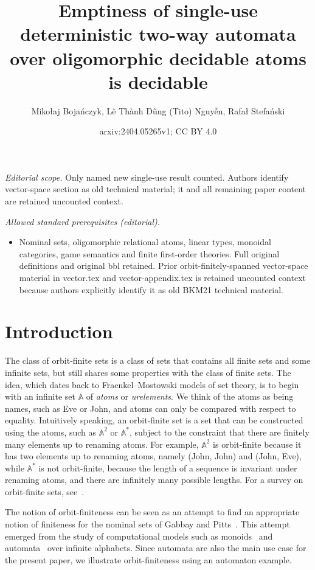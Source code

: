 \documentclass[10pt,a4paper]{amsart}
\title{Emptiness of single-use deterministic two-way automata over oligomorphic decidable atoms is decidable}
\author{Mikołaj Bojańczyk, Lê Thành Dũng (Tito) Nguyễn, Rafał Stefański}
\date{arxiv:2404.05265v1; CC BY 4.0}
\numberwithin{equation}{section}
\theoremstyle{plain}
\newcommand{\atoms}{\mathbb A}
\begin{document}
\maketitle
\noindent\textit{Editorial scope.} Only named new single-use result counted. Authors identify vector-space section as old technical material; it and all remaining paper content are retained uncounted context.\par\medskip
\noindent\textit{Allowed standard prerequisites (editorial).}\begin{itemize}
\item Nominal sets, oligomorphic relational atoms, linear types, monoidal categories, game semantics and finite first-order theories. Full original definitions and original bbl retained. Prior orbit-finitely-spanned vector-space material in vector.tex and vector-appendix.tex is retained uncounted context because authors explicitly identify it as old BKM21 technical material.
\end{itemize}\medskip
\section{Introduction}
The class of orbit-finite sets is a class of sets that contains all finite sets and some infinite sets, but still shares some properties with the class of finite sets.  The idea, which dates back to Fraenkel--Mostowski models of set theory,  is to begin with an infinite set $\atoms$ of \emph{atoms} or \emph{urelements}. We think of the atoms as being names, such as Eve or John, and atoms can only be compared with respect to equality. Intuitively speaking, an  orbit-finite set is a set  that can be constructed using the atoms, such as $\atoms^2$ or $\atoms^*$, subject to the constraint that there are finitely many elements up to  renaming atoms. For example, $\atoms^2$ is orbit-finite because it has two elements up to renaming atoms, namely (John, John) and (John, Eve), while $\atoms^*$ is not orbit-finite, because the length of a sequence is invariant under renaming atoms, and there are infinitely many possible lengths. For a survey on orbit-finite sets, see~\cite{bojanczyk_slightly2018}.

The notion of orbit-finiteness can be seen as an attempt to find an appropriate notion of finiteness for the  nominal sets of Gabbay and Pitts~\cite{PittsAM:nomsns}.  This attempt emerged from the study of computational models such as monoids~\cite{bojanczykNominalMonoids2013} and automata~\cite{bojanczykAutomataTheoryNominal2014} over infinite alphabets. Since automata are also the main use case for the present paper, we illustrate orbit-finiteness using an automaton example. 
\end{document}
